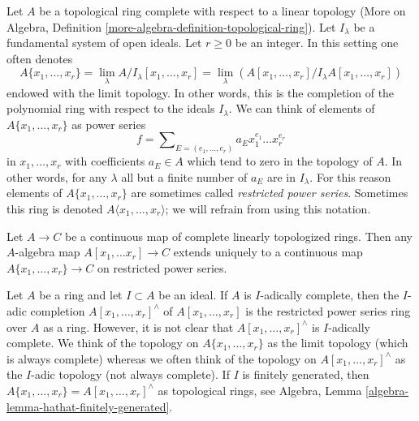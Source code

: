 \noindent
Let $A$ be a topological ring complete with respect to a linear
topology (More on Algebra, Definition
\ref{more-algebra-definition-topological-ring}).
Let $I_\lambda$ be a fundamental system of open ideals.
Let $r \geq 0$ be an integer. In this setting one often
denotes
$$
A\{x_1, \ldots, x_r\} =
\lim_\lambda A/I_\lambda[x_1, \ldots, x_r] =
\lim_\lambda (A[x_1, \ldots, x_r]/I_\lambda A[x_1, \ldots, x_r])
$$
endowed with the limit topology. In other words, this is
the completion of the polynomial ring with respect to the
ideals $I_\lambda$. We can think of elements of $A\{x_1, \ldots, x_r\}$ as
power series
$$
f = \sum\nolimits_{E = (e_1, \ldots, e_r)} a_E x_1^{e_1} \ldots x_r^{e_r}
$$
in $x_1, \ldots, x_r$ with coefficients $a_E \in A$ which tend
to zero in the topology of $A$. In other words, for any $\lambda$
all but a finite number of $a_E$ are in $I_\lambda$.
For this reason elements of $A\{x_1, \ldots, x_r\}$ are sometimes
called {\it restricted power series}.
Sometimes this ring is denoted $A\langle x_1, \ldots, x_r\rangle$;
we will refrain from using this notation.

\begin{remark}
\label{remark-universal-property}
\begin{reference}
\cite[Chapter 0, 7.5.3]{EGA}
\end{reference}
Let $A \to C$ be a continuous map of complete linearly topologized rings.
Then any $A$-algebra map $A[x_1, \ldots x_r] \to C$ extends uniquely to a
continuous map $A\{x_1, \ldots, x_r\} \to C$ on restricted power series.
\end{remark}

\begin{remark}
\label{remark-I-adic-completion-and-restricted-power-series}
Let $A$ be a ring and let $I \subset A$ be an ideal. If $A$ is $I$-adically
complete, then the $I$-adic completion $A[x_1, \ldots, x_r]^\wedge$ of
$A[x_1, \ldots, x_r]$ is the restricted power series ring over $A$ as a
ring. However, it is not clear that $A[x_1, \ldots, x_r]^\wedge$ is
$I$-adically complete. We think of the topology on $A\{x_1, \ldots, x_r\}$
as the limit topology (which is always complete) whereas we often think of
the topology on $A[x_1, \ldots, x_r]^\wedge$ as the $I$-adic topology
(not always complete). If $I$ is finitely generated, then
$A\{x_1, \ldots, x_r\} = A[x_1, \ldots, x_r]^\wedge$ as topological
rings, see Algebra, Lemma \ref{algebra-lemma-hathat-finitely-generated}.
\end{remark}





